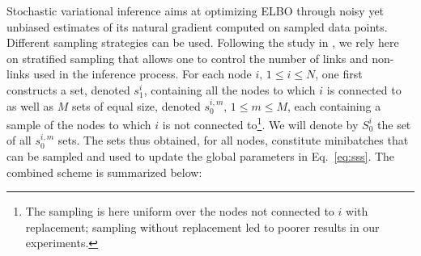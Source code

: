 Stochastic variational inference aims at optimizing ELBO through noisy yet unbiased estimates of its natural gradient computed on sampled data points. Different sampling strategies \cite{gopalan2013efficient,kim2013efficient} can be used. Following the study in \cite{gopalan2013efficient}, we rely here on stratified sampling that allows one to control the number of links and non-links used in the inference process. For each node $i, \, 1 \le i \le N$, one first constructs a set, denoted $s_1^i$, containing all the nodes to which $i$ is connected to as well as $M$ sets of equal size, denoted $s_0^{i,m}, \, 1 \le m \le M$, each containing a sample of the nodes to which $i$ is not connected to\footnote{The sampling is here uniform over the nodes not connected to $i$ with replacement; sampling without replacement led to poorer results in our experiments.}. We will denote by $S_0^i$ the set of all $s_0^{i,m}$ sets. The sets thus obtained, for all nodes, constitute minibatches that can be sampled and used to update the global parameters in Eq.~\ref{eq:sss}. The combined scheme is summarized below:
%
